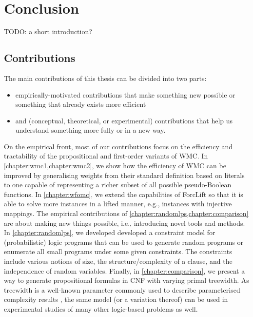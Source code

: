 \chapter{Conclusion} \label{chapter:conclusion} %


TODO: a short introduction?

\section{Contributions}

The main contributions of this thesis can be divided into two parts:
\begin{itemize}
\item empirically-motivated contributions that make something new possible or something that already exists more efficient
\item and (conceptual, theoretical, or experimental) contributions that help us understand something more fully or in a new way.
\end{itemize}


On the empirical front, most of our contributions focus on the efficiency and tractability of the propositional and first-order variants of WMC. In \cref{chapter:wmc1,chapter:wmc2}, we show how the efficiency of WMC can be improved by generalising weights from their standard definition based on literals to one capable of representing a richer subset of all possible pseudo-Boolean functions. In \cref{chapter:wfomc}, we extend the capabilities of ForcLift \citep{DBLP:conf/ijcai/BroeckTMDR11} so that it is able to solve more instances in a lifted manner, e.g., instances with injective mappings. The empirical contributions of \cref{chapter:randomlps,chapter:comparison} are about making new things possible, i.e., introducing novel tools and methods. In \cref{chapter:randomlps}, we developed developed a constraint model for (probabilistic) logic programs that can be used to generate random programs or enumerate all small programs under some given constraints. The constraints include various notions of size, the structure/complexity of a clause, and the independence of random variables. Finally, in \cref{chapter:comparison}, we present a way to generate propositional formulas in CNF with varying primal treewidth. As treewidth is a well-known parameter commonly used to describe parameterised complexity results \citep{DBLP:series/txcs/DowneyF13}, the same model (or a variation thereof) can be used in experimental studies of many other logic-based problems as well.

